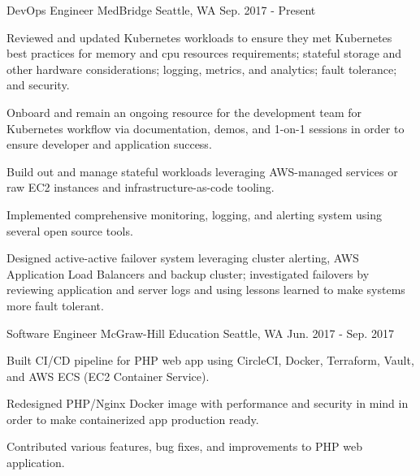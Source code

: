 


\begin{cventries}


\cventry
{DevOps Engineer} %
{MedBridge} %
{Seattle, WA} %
{Sep. 2017 - Present} %
{ %
\begin{cvitems}
\item {Reviewed and updated Kubernetes workloads to ensure they met Kubernetes best practices for memory and cpu resources requirements; stateful storage and other hardware considerations; logging, metrics, and analytics; fault tolerance; and security.}
\item {Onboard and remain an ongoing resource for the development team for Kubernetes workflow via documentation, demos, and 1-on-1 sessions in order to ensure developer and application success.}
\item {Build out and manage stateful workloads leveraging AWS-managed services or raw EC2 instances and infrastructure-as-code tooling.}
\item {Implemented comprehensive monitoring, logging, and alerting system using several open source tools.} 
\item {Designed active-active failover system leveraging cluster alerting, AWS Application Load Balancers and backup cluster; investigated failovers by reviewing application and server logs and using lessons learned to make systems more fault tolerant.}
\end{cvitems}
}


\cventry
{Software Engineer} %
{McGraw-Hill Education} %
{Seattle, WA} %
{Jun. 2017 - Sep. 2017} %
{ %
\begin{cvitems}
\item {Built CI/CD pipeline for PHP web app using CircleCI, Docker, Terraform, Vault, and AWS ECS (EC2 Container Service).}
\item {Redesigned PHP/Nginx Docker image with performance and security in mind in order to make containerized app production ready.}
\item {Contributed various features, bug fixes, and improvements to PHP web application.}
\end{cvitems}
}


\end{cventries}
